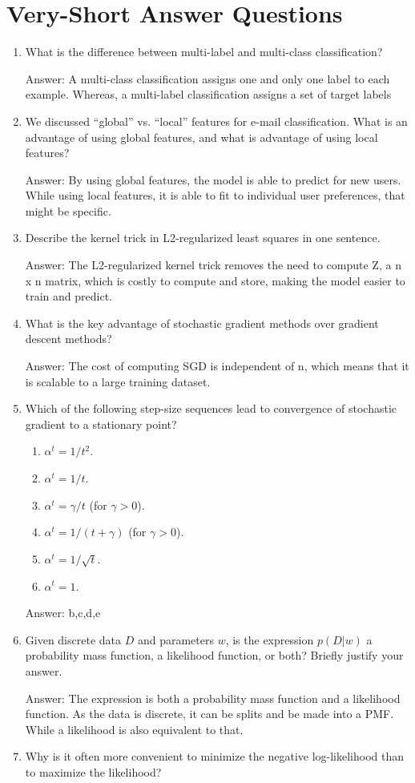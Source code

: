 \documentclass{article}
\def\ans#1{\par\gre{Answer: #1}}
\def\gre#1{{\color{gre}#1}}
\def\enum#1{\begin{enumerate}#1\end{enumerate}}
\begin{document}
\pagebreak

\section{Very-Short Answer Questions}


\enum{
\item What is the difference between multi-label and multi-class classification?
\ans{A multi-class classification assigns one and only one label to each example. Whereas, a multi-label classification assigns a set of target labels}
\item We discussed ``global'' vs. ``local'' features for e-mail classification. What is an advantage of using global features, and what is advantage of using local features?
\ans{By using global features, the model is able to predict for new users. While using local features, it is able to fit to individual user preferences, that might be specific.}
\item Describe the kernel trick in L2-regularized least squares in one sentence.
\ans{The L2-regularized kernel trick removes the need to compute Z, a n x n matrix, which is costly to compute and store, making the model easier to train and predict.}
\item What is the key advantage of stochastic gradient methods over gradient descent methods?
\ans{The cost of computing SGD is independent of n, which means that it is scalable to a large training dataset.}
\item Which of the following step-size sequences lead to convergence of stochastic gradient to a stationary point?
\enum{
\item $\alpha^t = 1/t^2$.
\item $\alpha^t = 1/t$.
\item $\alpha^t = \gamma/t$ (for $\gamma > 0$).
\item $\alpha^t = 1/(t+\gamma)$ (for $\gamma > 0$).
\item $\alpha^t = 1/\sqrt{t}$.
\item $\alpha^t = 1$.
}
\ans{b,c,d,e}
\item{Given discrete data $D$ and parameters $w$, is the expression $p(D|w)$ a probability mass function, a likelihood function, or both? Briefly justify your answer.}
\ans{The expression is both a probability mass function and a likelihood function. As the data is discrete, it can be splits and be made into a PMF. While a likelihood is also equivalent to that.}
\item{Why is it often more convenient to minimize the negative log-likelihood than to maximize the likelihood?}
}
\end{document}
